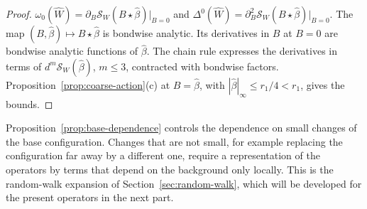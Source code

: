 \begin{proof}
$\omega_0(\hat W)=\partial_B\mathcal S_W(B\star\hat\beta)|_{B=0}$ and $\Delta^0(\hat W)=\partial^2_B\mathcal S_W(B\star\hat\beta)|_{B=0}$. The map $(B,\hat\beta)\mapsto B\star\hat\beta$ is bondwise analytic. Its derivatives in $B$ at $B=0$ are bondwise analytic functions of $\hat\beta$. The chain rule expresses the derivatives in terms of $d^m\mathcal S_W(\hat\beta)$, $m\le3$, contracted with bondwise factors. Proposition~\ref{prop:coarse-action}(c) at $B=\hat\beta$, with $|\hat\beta|_\infty\le r_1/4<r_1$, gives the bounds.
\end{proof}

Proposition~\ref{prop:base-dependence} controls the dependence on small changes of the base configuration. Changes that are not small, for example replacing the configuration far away by a different one, require a representation of the operators by terms that depend on the background only locally. This is the random-walk expansion of Section~\ref{sec:random-walk}, which will be developed for the present operators in the next part.
